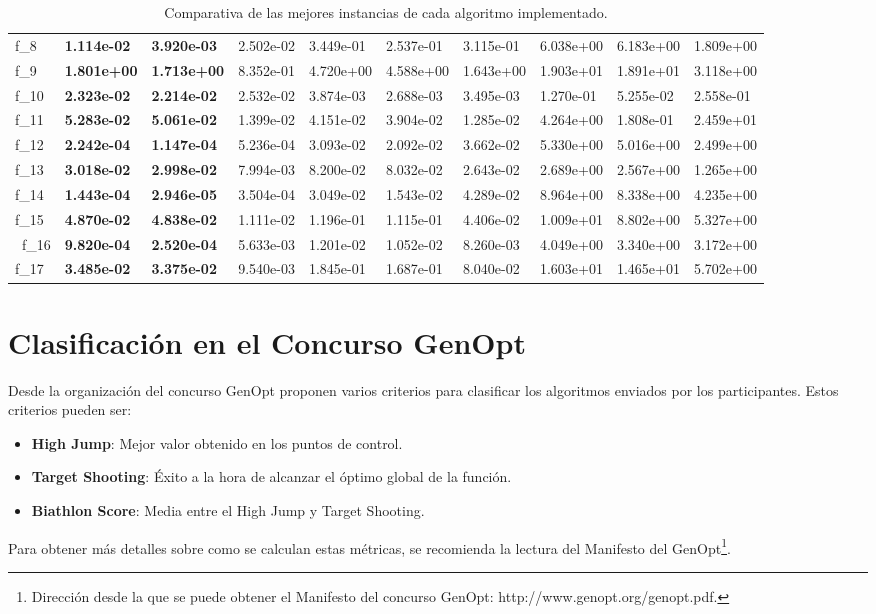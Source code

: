 \begin{table}[!ht]
{\begin{tabular}{LLLLLLLLLL}
f_{8} & {\bf 1.114e-02} & {\bf 3.920e-03} & 2.502e-02 & 3.449e-01 & 2.537e-01 & 3.115e-01 & 6.038e+00 & 6.183e+00 & 1.809e+00\\
f_{9} & {\bf 1.801e+00} & {\bf 1.713e+00} & 8.352e-01 & 4.720e+00 & 4.588e+00 & 1.643e+00 & 1.903e+01 & 1.891e+01 & 3.118e+00\\
f_{10} & {\bf 2.323e-02} & {\bf 2.214e-02} & 2.532e-02 & 3.874e-03 &  2.688e-03 & 3.495e-03 & 1.270e-01 &   5.255e-02  & 2.558e-01\\
f_{11} & {\bf 5.283e-02} & {\bf 5.061e-02} & 1.399e-02 & 4.151e-02 &  3.904e-02 & 1.285e-02 & 4.264e+00 &   1.808e-01  & 2.459e+01\\
f_{12} & {\bf 2.242e-04} & {\bf 1.147e-04} & 5.236e-04 & 3.093e-02 & 2.092e-02 & 3.662e-02 & 5.330e+00 &   5.016e+00  & 2.499e+00\\
f_{13} & {\bf 3.018e-02} & {\bf 2.998e-02} & 7.994e-03 & 8.200e-02 & 8.032e-02 & 2.643e-02 & 2.689e+00 &   2.567e+00  & 1.265e+00\\
f_{14} & {\bf 1.443e-04} & {\bf 2.946e-05} & 3.504e-04 & 3.049e-02 &  1.543e-02 & 4.289e-02 & 8.964e+00 &   8.338e+00  & 4.235e+00\\
f_{15} & {\bf 4.870e-02} & {\bf 4.838e-02} & 1.111e-02 & 1.196e-01 &  1.115e-01 & 4.406e-02 & 1.009e+01 &   8.802e+00  & 5.327e+00\\\
f_{16} & {\bf 9.820e-04} & {\bf 2.520e-04} & 5.633e-03 & 1.201e-02 &  1.052e-02 & 8.260e-03  & 4.049e+00 &   3.340e+00  & 3.172e+00\\
f_{17} & {\bf 3.485e-02} & {\bf 3.375e-02} & 9.540e-03 & 1.845e-01 &  1.687e-01 & 8.040e-02 & 1.603e+01 &   1.465e+01  & 5.702e+00\\
    \bottomrule
    \end{tabular}}
    \captionsetup{justification=centering}
    \caption{Comparativa de las mejores instancias de cada algoritmo implementado.}    
\end{table}
\newpage

\section{Clasificación en el Concurso GenOpt}\label{sec:Competition}

Desde la organización del concurso GenOpt proponen varios criterios para clasificar los algoritmos enviados por los participantes. Estos criterios pueden ser:

\begin{itemize}
    	  	\item \textbf{High Jump}: Mejor valor obtenido en los puntos de control.
    	  	\item \textbf{Target Shooting}: Éxito a la hora de alcanzar el óptimo global de la función.
    	  	\item \textbf{Biathlon Score}: Media entre el High Jump y Target Shooting.
\end{itemize}
Para obtener más detalles sobre como se calculan estas métricas, se recomienda la lectura del Manifesto del GenOpt\footnote{Dirección desde la que se puede obtener el Manifesto del concurso GenOpt: http://www.genopt.org/genopt.pdf.}.

